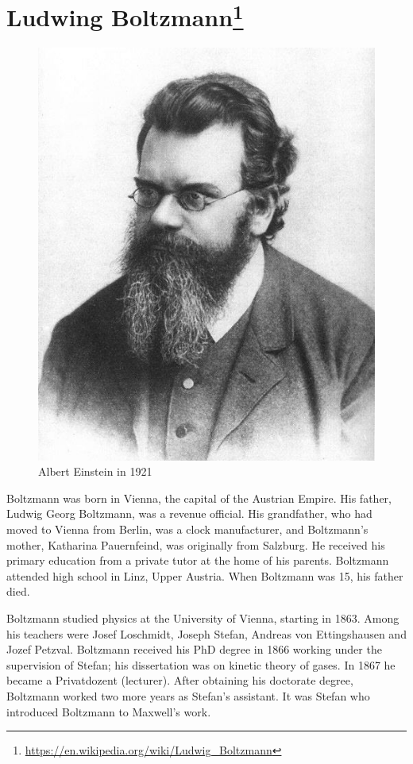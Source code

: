 \section*{Ludwing Boltzmann\protect\footnote{\url{https://en.wikipedia.org/wiki/Ludwig_Boltzmann}}}

\begin{figure}[ht]
  \centering
  \includegraphics[width=0.8\linewidth]{content/figures/Boltzmann_figure.jpg}
  \caption{Albert Einstein in 1921\protect\footnotemark}
\end{figure}

Boltzmann was born in Vienna, the capital of the Austrian Empire. His father, Ludwig Georg Boltzmann, was a revenue official. His grandfather, who had moved to Vienna from Berlin, was a clock manufacturer, and Boltzmann's mother, Katharina Pauernfeind, was originally from Salzburg. He received his primary education from a private tutor at the home of his parents. Boltzmann attended high school in Linz, Upper Austria. When Boltzmann was 15, his father died.

Boltzmann studied physics at the University of Vienna, starting in 1863. Among his teachers were Josef Loschmidt, Joseph Stefan, Andreas von Ettingshausen and Jozef Petzval. Boltzmann received his PhD degree in 1866 working under the supervision of Stefan; his dissertation was on kinetic theory of gases. In 1867 he became a Privatdozent (lecturer). After obtaining his doctorate degree, Boltzmann worked two more years as Stefan's assistant. It was Stefan who introduced Boltzmann to Maxwell's work.


